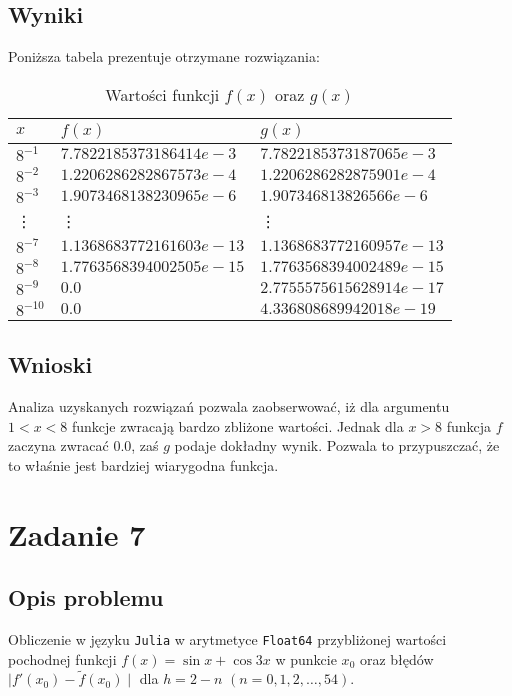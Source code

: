 \documentclass{classrep}
\begin{document}
	\subsection{Wyniki}
		Poniższa tabela prezentuje otrzymane rozwiązania:
		\begin{table}[h!]
        	\centering
        	\footnotesize
			\begin{tabular}{lll} \toprule
				$x$ & $f(x)$ & $g(x)$ \\ \midrule
				$8^{-1}$ & $7.7822185373186414e-3$ & $7.7822185373187065e-3$ \\ 
 				$8^{-2}$ & $1.2206286282867573e-4$ & $1.2206286282875901e-4$ \\
 				$8^{-3}$ & $1.9073468138230965e-6$ & $1.907346813826566e-6$ \\
 				\vdots & \vdots & \vdots \\
 				$8^{-7}$ & $1.1368683772161603e-13$ & $1.1368683772160957e-13$ \\
 				$8^{-8}$ & $1.7763568394002505e-15$ & $1.7763568394002489e-15$ \\
 				$8^{-9}$ & $0.0$ & $2.7755575615628914e-17$ \\
 				$8^{-10}$ & $0.0$ & $4.336808689942018e-19$ \\\bottomrule
 			\end{tabular}
 			\caption{Wartości funkcji $f(x)$ oraz $g(x)$}
			\label{table:10}
		\end{table}
	
	\subsection{Wnioski}
		Analiza uzyskanych rozwiązań pozwala zaobserwować, iż dla argumentu $1<x<8$ funkcje zwracają bardzo 
		zbliżone wartości. Jednak dla $x>8$ funkcja $f$ zaczyna zwracać $0.0$, zaś $g$ podaje dokładny wynik. 
		Pozwala to przypuszczać, że to właśnie jest bardziej wiarygodna funkcja.
\section{Zadanie 7}
	\subsection{Opis problemu}
		Obliczenie w języku \texttt{Julia} w arytmetyce \texttt{Float64} przybliżonej wartości pochodnej funkcji
		$f(x)=\sin{x}+\cos{3x}$ w punkcie $x_0$ oraz błędów $\mid f'(x_0)-\tilde{f}(x_0) \mid$ dla 
		$h=2-n$ $(n=0,1,2,\dots,54)$.
\end{document}
